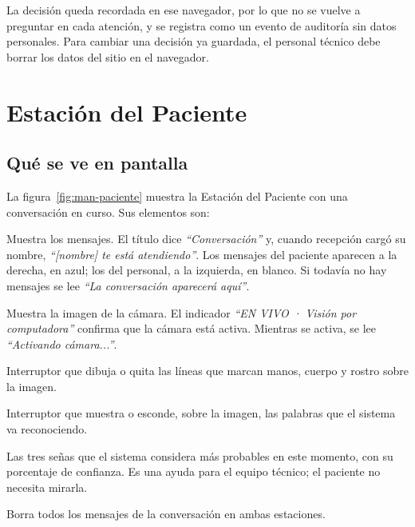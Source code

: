 
La decisión queda recordada en ese navegador, por lo que no se vuelve a preguntar en cada atención, y se registra como un evento de auditoría sin datos personales. Para cambiar una decisión ya guardada, el personal técnico debe borrar los datos del sitio en el navegador.

\section{Estación del Paciente}

\subsection{Qué se ve en pantalla}

La figura~\ref{fig:man-paciente} muestra la Estación del Paciente con una conversación en curso. Sus elementos son:
\begin{description}[style=nextline, leftmargin=1.5em]
  \item[Conversación (izquierda)] Muestra los mensajes. El título dice \emph{``Conversación''} y, cuando recepción cargó su nombre, \emph{``[nombre] te está atendiendo''}. Los mensajes del paciente aparecen a la derecha, en azul; los del personal, a la izquierda, en blanco. Si todavía no hay mensajes se lee \emph{``La conversación aparecerá aquí''}.
  \item[Captando señas (derecha)] Muestra la imagen de la cámara. El indicador \emph{``EN VIVO · Visión por computadora''} confirma que la cámara está activa. Mientras se activa, se lee \emph{``Activando cámara...''}.
  \item[Mostrar esqueleto] Interruptor que dibuja o quita las líneas que marcan manos, cuerpo y rostro sobre la imagen.
  \item[Mostrar palabras] Interruptor que muestra o esconde, sobre la imagen, las palabras que el sistema va reconociendo.
  \item[Top-3 Predicciones] Las tres señas que el sistema considera más probables en este momento, con su porcentaje de confianza. Es una ayuda para el equipo técnico; el paciente no necesita mirarla.
  \item[Limpiar Historial] Borra todos los mensajes de la conversación en ambas estaciones.
\end{description}


